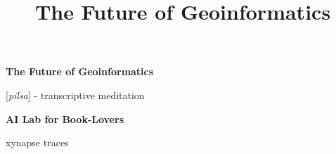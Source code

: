 
\title{The Future of Geoinformatics} %
\thispagestyle{empty}
\begin{center}
\vspace*{1.5in}
{\sffamily\Huge\bfseries The Future of Geoinformatics\par}
\vfill
{\fontsize{120}{144}\selectfont\sffamily\bfseries{}\par}
\vspace{0.5em}
{\sffamily\large [\textit{pilsa}] - transcriptive meditation\par}
\vfill
{\sffamily\Large\bfseries AI Lab for Book-Lovers\par}
\vfill
{\logofont\large xynapse traces\par}
\end{center}
